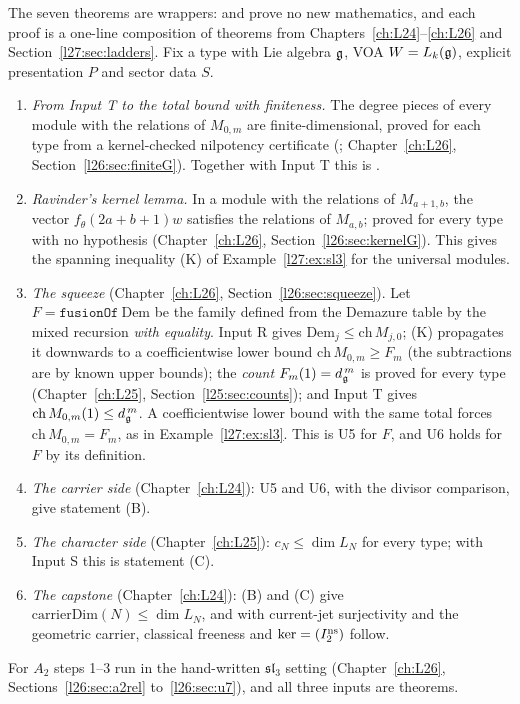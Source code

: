 The seven theorems are wrappers:  and
 prove no new mathematics, and each proof is a one-line composition of theorems
from Chapters~\ref{ch:L24}--\ref{ch:L26} and Section~\ref{l27:sec:ladders}. Fix a type with Lie algebra $\mathfrak g$, VOA
$W=L_k(\mathfrak g)$, explicit presentation $P$ and sector data $S$.
\begin{enumerate}
\item \emph{From Input T to the total bound with finiteness.} The degree pieces of every module with the relations of $M_{0,m}$
  are finite-dimensional, proved for each type from a kernel-checked nilpotency certificate (;
  Chapter~\ref{ch:L26}, Section~\ref{l26:sec:finiteG}). Together with Input T this is .
\item \emph{Ravinder's kernel lemma.} In a module with the relations of $M_{a+1,b}$, the vector $f_\theta(2a+b+1)w$ satisfies
  the relations of $M_{a,b}$; proved for every type with no hypothesis (Chapter~\ref{ch:L26}, Section~\ref{l26:sec:kernelG}). This
  gives the spanning inequality (K) of Example~\ref{l27:ex:sl3} for the universal modules.
\item \emph{The squeeze} (Chapter~\ref{ch:L26}, Section~\ref{l26:sec:squeeze}). Let $F=\mathtt{fusionOf}\ \mathrm{Dem}$ be the family
  defined from the Demazure table by the mixed recursion \emph{with equality}. Input R gives $\mathrm{Dem}_j\le\mathrm{ch}\,M_{j,0}$;
  (K) propagates it downwards to a coefficientwise lower bound $\mathrm{ch}\,M_{0,m}\ge F_m$ (the subtractions are by known upper
  bounds); the \emph{count} $F_m(1)=d_{\mathfrak g}^{\,m}$ is proved for every type (Chapter~\ref{ch:L25}, Section~\ref{l25:sec:counts});
  and Input T gives $\mathrm{ch}\,M_{0,m}(1)\le d_{\mathfrak g}^{\,m}$. A coefficientwise lower bound with the same total forces
  $\mathrm{ch}\,M_{0,m}=F_m$, as in Example~\ref{l27:ex:sl3}. This is U5 for $F$, and U6 holds for $F$ by its definition.
\item \emph{The carrier side} (Chapter~\ref{ch:L24}): U5 and U6, with the divisor comparison, give statement (B).
\item \emph{The character side} (Chapter~\ref{ch:L25}): $c_N\le\dim L_N$ for every type; with Input S this is statement (C).
\item \emph{The capstone} (Chapter~\ref{ch:L24}): (B) and (C) give $\mathrm{carrierDim}(N)\le\dim L_N$, and with current-jet
  surjectivity and the geometric carrier, classical freeness and $\ker=(I_2^{\mathrm{ns}})$ follow.
\end{enumerate}
For $A_2$ steps 1--3 run in the hand-written $\mathfrak{sl}_3$ setting (Chapter~\ref{ch:L26}, Sections~\ref{l26:sec:a2rel}
to~\ref{l26:sec:u7}), and all three inputs are theorems.

